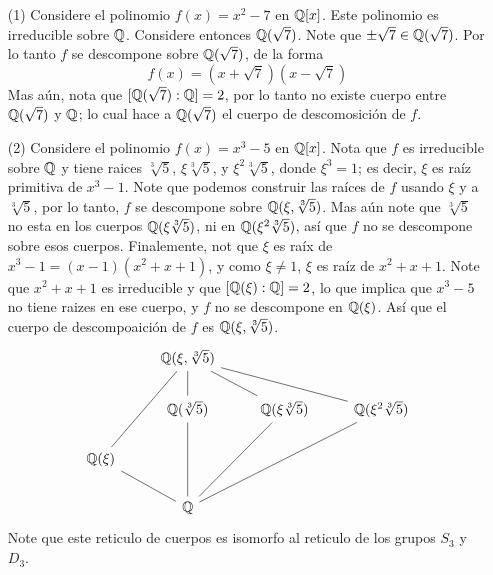 \begin{example}\label{}
    \begin{enumerate}
        \item[(1)] Considere el polinomio $f(x)=x^2-7$ en $\mathbb{Q}[x]$. Este
            polinomio es irreducible sobre $\mathbb{Q}$. Considere entonces
            $\mathbb{Q}(\sqrt{7})$. Note que $\pm \sqrt{7} \in \mathbb{Q}(\sqrt{7})$. Por lo
            tanto $f$ se descompone sobre $\mathbb{Q}(\sqrt{7})$, de la forma
            \begin{equation*}
                f(x)=(x+\sqrt{7})(x-\sqrt{7})
            \end{equation*}
            Mas a\'un, nota que $[\mathbb{Q}(\sqrt{7}) : \mathbb{Q}]=2$, por lo tanto no existe
            cuerpo entre $\mathbb{Q}(\sqrt{7})$ y $\mathbb{Q}$; lo cual hace a $\mathbb{Q}(\sqrt{7})$ el
            cuerpo de descomosici\'on de $f$.

        \item[(2)]  Considere el polinomio $f(x)=x^3-5$ en $\mathbb{Q}[x]$. Nota que $f$
            es irreducible sobre  $\mathbb{Q}$ y tiene raices  $\sqrt[3]{5}$,
            $\xi\sqrt[3]{5}$, y $\xi^2\sqrt[3]{5}$, donde $\xi^3=1$; es decir,
            $\xi$ es ra\'iz primitiva de $x^3-1$. Note que podemos construir las
            ra\'ices de  $f$ usando  $\xi$ y a  $\sqrt[3]{5}$, por lo tanto, $f$
            se descompone sobre  $\mathbb{Q}(\xi, \sqrt[3]{5})$. Mas a\'un note que
            $\sqrt[3]{5}$ no esta en los cuerpos $\mathbb{Q}(\xi\sqrt[3]{5})$, ni en
            $\mathbb{Q}(\xi^2\sqrt[3]{5})$, as\'i que $f$ no se descompone sobre esos
            cuerpos. Finalemente, not que $\xi$ es ra\'ix de
            $x^3-1=(x-1)(x^2+x+1)$, y como $\xi \neq 1$,  $\xi$ es ra\'iz de
            $x^2+x+1$. Note que  $x^2+x+1$ es irreducible y que  $[\mathbb{Q}(\xi) :
            \mathbb{Q}]=2$, lo que implica que $x^3-5$ no tiene raizes en ese cuerpo, y
             $f$ no se descompone en  $\mathbb{Q}(\xi)$. As\'i que el cuerpo de
             descompoaici\'on de $f$ es  $\mathbb{Q}(\xi,\sqrt[3]{5})$.
             \[\begin{tikzcd}
                & {\Q(\xi,\sqrt[3]{5})} \\
                & {\Q(\sqrt[3]{5})} & {\Q(\xi\sqrt[3]{5})} & {\Q(\xi^2\sqrt[3]{5})} \\
                {\Q(\xi)} \\
                & {\Q}
                \arrow[no head, from=1-2, to=2-2]
                \arrow[no head, from=1-2, to=2-3]
                \arrow[no head, from=1-2, to=2-4]
                \arrow[no head, from=1-2, to=3-1]
                \arrow[no head, from=3-1, to=4-2]
                \arrow[no head, from=2-2, to=4-2]
                \arrow[no head, from=2-3, to=4-2]
                \arrow[no head, from=2-4, to=4-2]
             \end{tikzcd}\]
             Note que este reticulo de cuerpos es isomorfo al reticulo de los
             grupos $S_3$ y $D_3$.


\end{enumerate}
\end{example}

